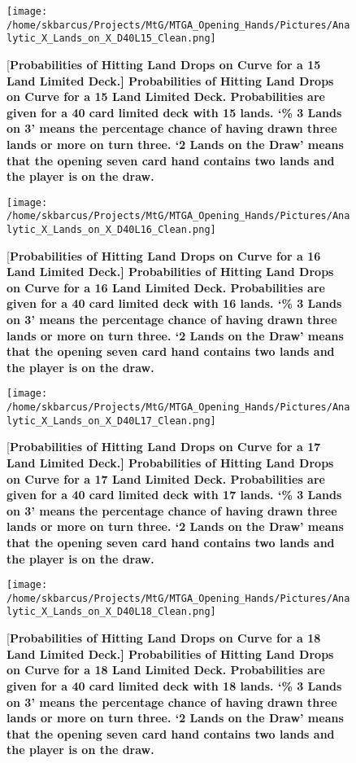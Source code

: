 \documentclass[oneside]{book}   %
\begin{document}
	\begin{figure}[!ht]
	\centering
	\centerline{\texttt{[image: /home/skbarcus/Projects/MtG/MTGA\_Opening\_Hands/Pictures/Analytic\_X\_Lands\_on\_X\_D40L15\_Clean.png]}}
	[\bf{Probabilities of Hitting Land Drops on Curve for a 15 Land Limited Deck.}]{
	{\bf{Probabilities of Hitting Land Drops on Curve for a 15 Land Limited Deck.}} Probabilities are given for a 40 card limited deck with 15 lands. `\% 3 Lands on 3' means the percentage chance of having drawn three lands or more on turn three. `2 Lands on the Draw' means that the opening seven card hand contains two lands and the player is on the draw.}
	\label{fig:15_curve}
	\end{figure}	
	
	\begin{figure}[!ht]
	\centering
	\centerline{\texttt{[image: /home/skbarcus/Projects/MtG/MTGA\_Opening\_Hands/Pictures/Analytic\_X\_Lands\_on\_X\_D40L16\_Clean.png]}}
	[\bf{Probabilities of Hitting Land Drops on Curve for a 16 Land Limited Deck.}]{
	{\bf{Probabilities of Hitting Land Drops on Curve for a 16 Land Limited Deck.}} Probabilities are given for a 40 card limited deck with 16 lands. `\% 3 Lands on 3' means the percentage chance of having drawn three lands or more on turn three. `2 Lands on the Draw' means that the opening seven card hand contains two lands and the player is on the draw.}
	\label{fig:16_curve}
	\end{figure}	
	
	\begin{figure}[!ht]
	\centering
	\centerline{\texttt{[image: /home/skbarcus/Projects/MtG/MTGA\_Opening\_Hands/Pictures/Analytic\_X\_Lands\_on\_X\_D40L17\_Clean.png]}}
	[\bf{Probabilities of Hitting Land Drops on Curve for a 17 Land Limited Deck.}]{
	{\bf{Probabilities of Hitting Land Drops on Curve for a 17 Land Limited Deck.}} Probabilities are given for a 40 card limited deck with 17 lands. `\% 3 Lands on 3' means the percentage chance of having drawn three lands or more on turn three. `2 Lands on the Draw' means that the opening seven card hand contains two lands and the player is on the draw.}
	\label{fig:17_curve}
	\end{figure}	
	
	\begin{figure}[!ht]
	\centering
	\centerline{\texttt{[image: /home/skbarcus/Projects/MtG/MTGA\_Opening\_Hands/Pictures/Analytic\_X\_Lands\_on\_X\_D40L18\_Clean.png]}}
	[\bf{Probabilities of Hitting Land Drops on Curve for a 18 Land Limited Deck.}]{
	{\bf{Probabilities of Hitting Land Drops on Curve for a 18 Land Limited Deck.}} Probabilities are given for a 40 card limited deck with 18 lands. `\% 3 Lands on 3' means the percentage chance of having drawn three lands or more on turn three. `2 Lands on the Draw' means that the opening seven card hand contains two lands and the player is on the draw.}
	\label{fig:18_curve}
	\end{figure}	
	
\end{document}
